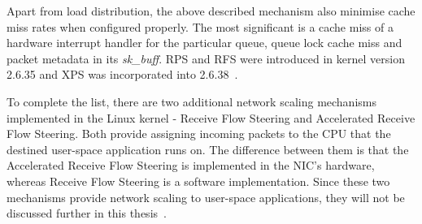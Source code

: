 Apart from load distribution, the above described mechanism also minimise cache miss rates when configured properly.
The most significant is a cache miss of a hardware interrupt handler for the particular queue,
queue lock cache miss and packet metadata in its {\it{sk\_buff}}.
RPS and RFS were introduced in kernel version 2.6.35
and XPS was incorporated into 2.6.38~\cite{kernel-doc-scaling}.

To complete the list, there are two additional network scaling mechanisms implemented in the Linux kernel - 
Receive Flow Steering and Accelerated Receive Flow Steering.
Both provide assigning incoming packets to the CPU that the destined user-space application runs on.
The difference between them is that the Accelerated Receive Flow Steering is implemented in the NIC's hardware,
whereas Receive Flow Steering is a software implementation.
Since these two mechanisms provide network scaling to user-space applications, they will not be discussed further in
this thesis~\cite{kernel-doc-scaling}.
